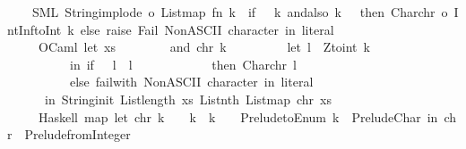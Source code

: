 \begin{isabellebody}
\ \ \ \ {\isacharparenleft}{\kern0pt}SML{\isacharparenright}{\kern0pt}\ {\isachardoublequoteopen}{\isacharbang}{\kern0pt}{\isacharparenleft}{\kern0pt}String{\isachardot}{\kern0pt}implode{\isacharslash}{\kern0pt}\ o\ List{\isachardot}{\kern0pt}map\ {\isacharparenleft}{\kern0pt}fn\ k\ {\isacharequal}{\kern0pt}{\isachargreater}{\kern0pt}\ if\ {}\ {\isacharless}{\kern0pt}{\isacharequal}{\kern0pt}\ k\ andalso\ k\ {\isacharless}{\kern0pt}\ {}{}{}\ then\ {\isacharparenleft}{\kern0pt}Char{\isachardot}{\kern0pt}chr\ o\ IntInf{\isachardot}{\kern0pt}toInt{\isacharparenright}{\kern0pt}\ k\ else\ raise\ Fail\ {\isachardoublequote}{\kern0pt}Non{\isacharminus}{\kern0pt}ASCII\ character\ in\ literal{\isachardoublequote}{\kern0pt}{\isacharparenright}{\kern0pt}{\isacharparenright}{\kern0pt}{\isachardoublequoteclose}\isanewline
\ \ \ \ \ {\isacharparenleft}{\kern0pt}OCaml{\isacharparenright}{\kern0pt}\ {\isachardoublequoteopen}{\isacharbang}{\kern0pt}{\isacharparenleft}{\kern0pt}let\ xs\ {\isacharequal}{\kern0pt}\ {\isacharunderscore}{\kern0pt}\isanewline
\ \ \ \ \ \ and\ chr\ k\ {\isacharequal}{\kern0pt}\isanewline
\ \ \ \ \ \ \ \ let\ l\ {\isacharequal}{\kern0pt}\ Z{\isachardot}{\kern0pt}to{\isacharprime}{\kern0pt}{\isacharunderscore}{\kern0pt}int\ k\isanewline
\ \ \ \ \ \ \ \ \ \ in\ if\ {}\ {\isacharless}{\kern0pt}{\isacharequal}{\kern0pt}\ l\ {\isacharampersand}{\kern0pt}{\isacharampersand}{\kern0pt}\ l\ {\isacharless}{\kern0pt}\ {}{}{}\isanewline
\ \ \ \ \ \ \ \ \ \ then\ Char{\isachardot}{\kern0pt}chr\ l\isanewline
\ \ \ \ \ \ \ \ \ \ else\ failwith\ {\isachardoublequote}{\kern0pt}Non{\isacharminus}{\kern0pt}ASCII\ character\ in\ literal{\isachardoublequote}{\kern0pt}\isanewline
\ \ \ \ \ \ in\ String{\isachardot}{\kern0pt}init\ {\isacharparenleft}{\kern0pt}List{\isachardot}{\kern0pt}length\ xs{\isacharparenright}{\kern0pt}\ {\isacharparenleft}{\kern0pt}List{\isachardot}{\kern0pt}nth\ {\isacharparenleft}{\kern0pt}List{\isachardot}{\kern0pt}map\ chr\ xs{\isacharparenright}{\kern0pt}{\isacharparenright}{\kern0pt}{\isacharparenright}{\kern0pt}{\isachardoublequoteclose}\isanewline
\ \ \ \ \ {\isacharparenleft}{\kern0pt}Haskell{\isacharparenright}{\kern0pt}\ {\isachardoublequoteopen}map{\isacharslash}{\kern0pt}\ {\isacharparenleft}{\kern0pt}let\ chr\ k\ {\isacharbar}{\kern0pt}\ {\isacharparenleft}{\kern0pt}{}\ {\isacharless}{\kern0pt}{\isacharequal}{\kern0pt}\ k\ {\isacharampersand}{\kern0pt}{\isacharampersand}{\kern0pt}\ k\ {\isacharless}{\kern0pt}\ {}{}{}{\isacharparenright}{\kern0pt}\ {\isacharequal}{\kern0pt}\ Prelude{\isachardot}{\kern0pt}toEnum\ k\ {\isacharcolon}{\kern0pt}{\isacharcolon}{\kern0pt}\ Prelude{\isachardot}{\kern0pt}Char\ in\ chr\ {\isachardot}{\kern0pt}\ Prelude{\isachardot}{\kern0pt}fromInteger{\isacharparenright}{\kern0pt}{\isachardoublequoteclose}\isanewline

\end{isabellebody}
